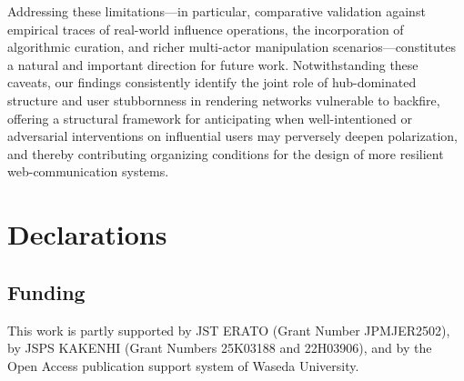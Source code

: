 \documentclass[pdflatex,sn-mathphys-num]{sn-jnl}%
\theoremstyle{thmstyleone}%
\theoremstyle{thmstyletwo}%
\theoremstyle{thmstylethree}%
\def\Blue{\color[rgb]{0,0,1}}
\def\Black{\color[rgb]{0,0,0}}
\begin{document}
Addressing these limitations---in particular, comparative validation against
empirical traces of real-world influence operations, the incorporation of
algorithmic curation, and richer multi-actor manipulation scenarios---constitutes a
natural and important direction for future work. Notwithstanding these caveats, our
findings consistently identify the joint role of hub-dominated structure and user
stubbornness in rendering networks vulnerable to backfire, offering a structural
framework for anticipating when well-intentioned or adversarial interventions on
influential users may perversely deepen polarization, and thereby contributing
organizing conditions for the design of more resilient web-communication systems.
\par




\Black

\backmatter

\section*{Declarations}

\subsection*{Funding} This work is partly supported by JST ERATO (Grant Number JPMJER2502), 
by JSPS KAKENHI (Grant Numbers 25K03188 and 22H03906), 
and by the Open Access publication support system of Waseda University.
\end{document}
